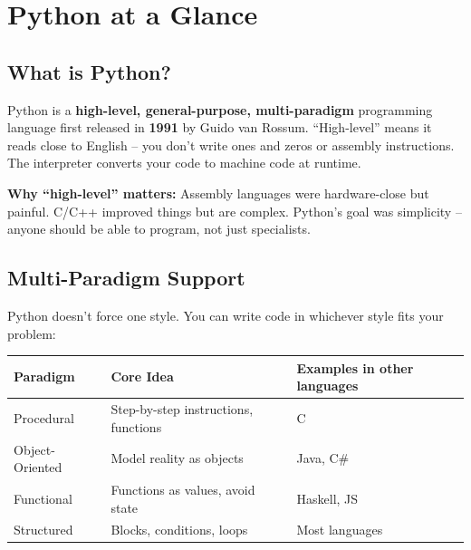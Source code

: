 \documentclass[12pt,a4paper]{article}
\begin{document}
\tableofcontents
\newpage

\section{Python at a Glance}

\subsection{What is Python?}

Python is a \textbf{high-level, general-purpose, multi-paradigm} programming language first released in \textbf{1991} by Guido van Rossum. ``High-level'' means it reads close to English -- you don't write ones and zeros or assembly instructions. The interpreter converts your code to machine code at runtime.

\begin{notebox}
\textbf{Why ``high-level'' matters:}
Assembly languages were hardware-close but painful. C/C++ improved things but are complex. Python's goal was simplicity -- anyone should be able to program, not just specialists.
\end{notebox}

\subsection{Multi-Paradigm Support}

Python doesn't force one style. You can write code in whichever style fits your problem:

\begin{center}
\begin{tabular}{lll}
\toprule
\textbf{Paradigm} & \textbf{Core Idea} & \textbf{Examples in other languages} \\
\midrule
Procedural & Step-by-step instructions, functions & C \\
Object-Oriented & Model reality as objects & Java, C\# \\
Functional & Functions as values, avoid state & Haskell, JS \\
Structured & Blocks, conditions, loops & Most languages \\
\bottomrule
\end{tabular}
\end{center}
\end{document}
